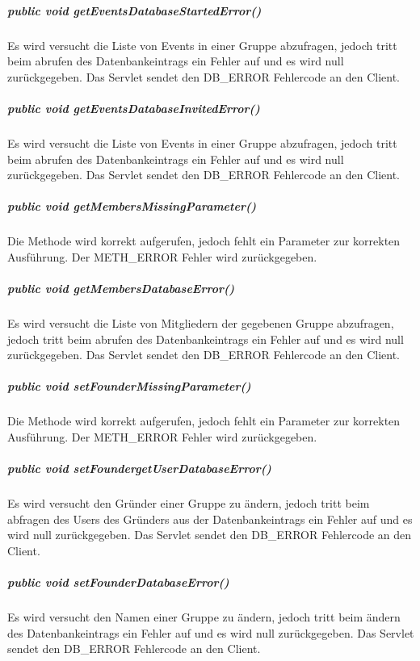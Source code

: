 \documentclass{scrartcl}
\begin{document}
\subparagraph{public void getEventsDatabaseStartedError()}
Es wird versucht die Liste von Events in einer Gruppe abzufragen, jedoch tritt beim abrufen des Datenbankeintrags ein Fehler auf und es wird null zurückgegeben. Das Servlet sendet den DB\_ERROR Fehlercode an den Client.
\subparagraph{public void getEventsDatabaseInvitedError()}
Es wird versucht die Liste von Events in einer Gruppe abzufragen, jedoch tritt beim abrufen des Datenbankeintrags ein Fehler auf und es wird null zurückgegeben. Das Servlet sendet den DB\_ERROR Fehlercode an den Client.
\subparagraph{public void getMembersMissingParameter()}
Die Methode wird korrekt aufgerufen, jedoch fehlt ein Parameter zur korrekten Ausführung. Der METH\_ERROR Fehler wird zurückgegeben.
\subparagraph{public void getMembersDatabaseError()}
Es wird versucht die Liste von Mitgliedern der gegebenen Gruppe abzufragen, jedoch tritt beim abrufen des Datenbankeintrags ein Fehler auf und es wird null zurückgegeben. Das Servlet sendet den DB\_ERROR Fehlercode an den Client.
\subparagraph{public void setFounderMissingParameter()}
Die Methode wird korrekt aufgerufen, jedoch fehlt ein Parameter zur korrekten Ausführung. Der METH\_ERROR Fehler wird zurückgegeben.
\subparagraph{public void setFoundergetUserDatabaseError()}
Es wird versucht den Gründer einer Gruppe zu ändern, jedoch tritt beim abfragen des Users des Gründers aus der Datenbankeintrags ein Fehler auf und es wird null zurückgegeben. Das Servlet sendet den DB\_ERROR Fehlercode an den Client.
\subparagraph{public void setFounderDatabaseError()}
Es wird versucht den Namen einer Gruppe zu ändern, jedoch tritt beim ändern des Datenbankeintrags ein Fehler auf und es wird null zurückgegeben. Das Servlet sendet den DB\_ERROR Fehlercode an den Client.
\end{document}
